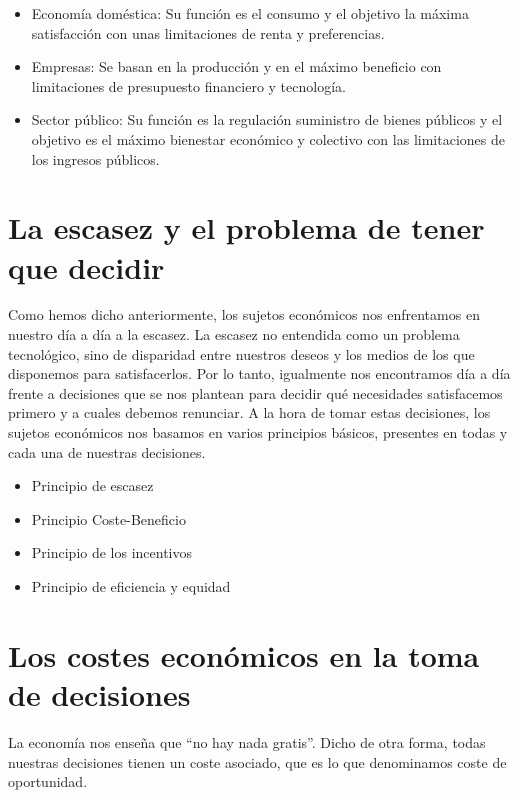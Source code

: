 \documentclass[
]{book}
\providecommand{\tightlist}{%
  \setlength{\itemsep}{0pt}\setlength{\parskip}{0pt}}
\begin{document}
\begin{itemize}
\tightlist
\item
  Economía doméstica: Su función es el consumo y el objetivo la máxima satisfacción con unas limitaciones de renta y preferencias.
\item
  Empresas: Se basan en la producción y en el máximo beneficio con limitaciones de presupuesto financiero y tecnología.
\item
  Sector público: Su función es la regulación suministro de bienes públicos y el objetivo es el máximo bienestar económico y colectivo con las limitaciones de los ingresos públicos.
\end{itemize}

\hypertarget{la-escasez-y-el-problema-de-tener-que-decidir}{%
\section{La escasez y el problema de tener que decidir}\label{la-escasez-y-el-problema-de-tener-que-decidir}}

Como hemos dicho anteriormente, los sujetos económicos nos enfrentamos en nuestro día a día a la escasez. La escasez no entendida como un problema tecnológico, sino de disparidad
entre nuestros deseos y los medios de los que disponemos para satisfacerlos.
Por lo tanto, igualmente nos encontramos día a día frente a decisiones que se nos plantean para decidir qué necesidades satisfacemos primero y a cuales debemos renunciar. A la hora de tomar estas decisiones, los sujetos económicos nos basamos en varios principios básicos, presentes en todas y cada una de nuestras decisiones.

\begin{itemize}
\tightlist
\item
  Principio de escasez
\item
  Principio Coste-Beneficio
\item
  Principio de los incentivos
\item
  Principio de eficiencia y equidad
\end{itemize}

\hypertarget{los-costes-econuxf3micos-en-la-toma-de-decisiones}{%
\section{Los costes económicos en la toma de decisiones}\label{los-costes-econuxf3micos-en-la-toma-de-decisiones}}

La economía nos enseña que ``no hay nada gratis''. Dicho de otra forma, todas nuestras decisiones tienen un coste asociado, que es lo que denominamos coste de oportunidad.
\end{document}
